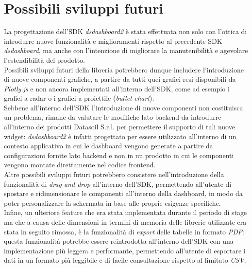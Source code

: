 \section{Possibili sviluppi futuri}
La progettazione dell'SDK \textit{dsdashboard2} è stata effettuata non solo con l'ottica di introdurre nuove funzionalità e miglioramenti rispetto al precedente
SDK \textit{dsdashboard}, ma anche con l'intenzione di migliorare la manutenibilità e agevolare l'estendibilità del prodotto. \\
Possibili sviluppi futuri della libreria potrebbero dunque includere l'introduzione di nuove componenti grafiche, a partire da tutti quei grafici resi disponibili
da \textit{Plotly.js} e non ancora implementati all'interno dell'SDK, come ad esempio i grafici a radar o i grafici a proiettile (\textit{bullet chart}). \\
Sebbene all'interno dell'SDK l'introduzione di nuove componenti non costituisca un problema, rimane da valutare le modifiche lato backend da introdurre all'interno
dei prodotti Datasoil S.r.l. per permettere il supporto di tali nuove widget: \textit{dsdashboard2} è infatti progettato per essere utilizzato all'interno
di un contesto applicativo in cui le dashboard vengono generate a partire da configurazioni fornite lato backend e non in un prodotto in cui le componenti
vengono montate direttamente nel codice frontend. \\
Altre possibili sviluppi futuri potrebbero consistere nell'introduzione della funzionalità di \textit{drag and drop} all'interno dell'SDK, permettendo all'utente
di spostare e ridimensionare le componenti all'interno della dashboard, in modo da poter personalizzare la schermata in base alle proprie esigenze specifiche. \\
Infine, un ulteriore feature che era stata implementata durante il periodo di stage ma che a causa delle dimensioni in termini di memoria delle librerie utilizzate
era stata in seguito rimossa, è la funzionalità di \textit{export} delle tabelle in formato \textit{PDF}: questa funzionalità potrebbe essere reintrodotta all'interno
dell'SDK con una implementazione più leggera e performante, permettendo all'utente di esportare i dati in un formato più leggibile e di facile consultazione rispetto
al limitato \textit{CSV}.

